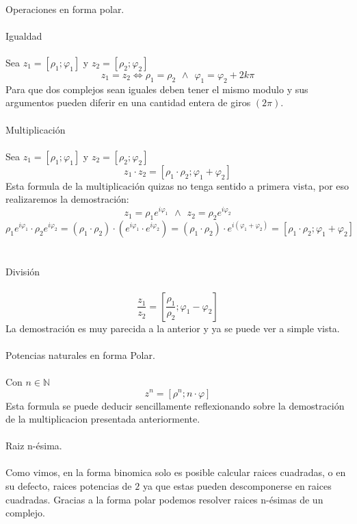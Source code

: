 \documentclass[]{article}
\begin{document}
\\
\huge Operaciones en forma polar.
\\
\\
\Large Igualdad
\normalsize
\\
\\
Sea $z_1=[\rho_1;\varphi_1]$ y $z_2=[\rho_2;\varphi_2]$
$$
z_1 = z_2 \Leftrightarrow \rho_1 = \rho_2 \hspace{5pt} \wedge \hspace{5pt} \varphi_1 = \varphi_2 + 2k\pi
$$
Para que dos complejos sean iguales deben tener el mismo modulo y sus argumentos pueden diferir en una cantidad entera de giros $(2\pi)$.
\\
\\
\Large Multiplicación
\normalsize
\\
\\
Sea $z_1=[\rho_1;\varphi_1]$ y $z_2=[\rho_2;\varphi_2]$
$$
z_1 \cdot z_2 = [\rho_1 \cdot \rho_2 ;\varphi_1 + \varphi_2 ]
$$
Esta formula de la multiplicación quizas no tenga sentido a primera vista, por eso realizaremos la demostración:
$$
z_1 = \rho_1e^{i\varphi_1} \hspace{5pt} \wedge \hspace{5pt} z_2 = \rho_2e^{i\varphi_2}
$$
$$
\rho_1e^{i\varphi_1} \cdot \rho_2e^{i\varphi_2} = (\rho_1 \cdot \rho_2) \cdot (e^{i\varphi_1}\cdot e^{i\varphi_2}) = (\rho_1 \cdot \rho_2) \cdot e^{i(\varphi_1 + \varphi_2)} = [\rho_1 \cdot \rho_2 ;\varphi_1 + \varphi_2 ]
$$
\\
\\
\Large División
\normalsize
\\
\\
$$
\frac{z_1}{z_2} = [\frac{\rho_1}{\rho_2 };\varphi_1 - \varphi_2 ]
$$
La demostración es muy parecida a la anterior y ya se puede ver a simple vista.
\\
\\
\Large Potencias naturales en forma Polar.
\normalsize
\\
\\
Con $n \in \mathbb{N}$
$$
z^{n} = [\rho^{n}; n\cdot\varphi]
$$
Esta formula se puede deducir sencillamente reflexionando sobre la demostración de la multiplicacion presentada anteriormente.
\\
\\
\Large Raiz n-ésima.
\normalsize
\\
\\
Como vimos, en la forma binomica solo es posible calcular raices cuadradas, o en su defecto, raices potencias de $2$ ya que estas pueden descomponerse en raices cuadradas. Gracias a la forma polar podemos resolver raices n-ésimas de un complejo.
\end{document}
